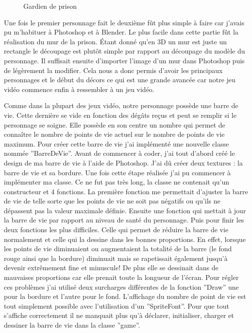 \documentclass[12pt]{article}
\begin{document}
\begin{figure}[htbp]
\begin{minipage}[c]{.45\linewidth}
\begin{center}
\caption{Gardien de prison}
\label{fig:bellik}
\end{center}
\end{minipage}
\end{figure}

\par
Une fois le premier personnage fait le deuxième fût plus simple à faire car j'avais pu m'habituer à Photoshop et à Blender. Le plus facile dans cette partie fût la réalisation du mur de la prison. Étant donné qu'en 3D un mur est juste un rectangle le découpage est plutôt simple par rapport au découpage du modèle du personnage. Il suffisait ensuite d'importer l'image d'un mur dans Photoshop puis de légèrement la modifier. Cela nous a donc permis d'avoir les principaux personnages et le début du décors ce qui est une grande avancée car notre jeu vidéo commence enfin à ressembler à un jeu vidéo.

\par
Comme dans la plupart des jeux vidéo, notre personnage possède une barre de vie. Cette dernière se vide en fonction des dégâts reçus et peut se remplir si le personnage se soigne. Elle possède en son centre un nombre qui permet de connaître le nombre de points de vie actuel sur le nombre de points de vie maximum. Pour créer cette barre de vie j'ai implémenté une nouvelle classe nommée ''BarreDeVie''. Avant de commencer à coder, j'ai tout d'abord créé le design de ma barre de
vie à l'aide de Photoshop. J'ai dû créer deux textures : la barre de vie et sa bordure. Une fois cette étape réalisée j'ai pu commencer à implémenter ma classe. Ce ne fut pas très long, la classe ne contenait qu'un constructeur et 4 fonctions. La première fonction me permettait d'ajuster la barre de vie de telle sorte que les points de vie ne soit pas négatifs ou qu'ils ne dépassent pas la valeur maximale définie. Ensuite une fonction qui mettait à jour la barre de vie par rapport au niveau de santé du personnage. Puis pour finir les deux fonctions les plus difficiles. Celle qui permet de réduire la barre de vie normalement et celle qui la dessine dans les bonnes proportions. En effet, lorsque les points de vie diminuaient ou augmentaient la totalité de la barre (le fond rouge ainsi que la bordure) diminuait mais se rapetissait également jusqu'à devenir extrêmement fine et minuscule! De plus elle se dessinait dans de mauvaises proportions car elle prenait toute la longueur de l'écran. Pour régler ces problèmes j'ai utilisé deux surcharges différentes de la fonction ''Draw'' une pour la bordure et l'autre pour le fond. L'affichage du nombre de point de vie est tout simplement possible avec l'utilisation d'un ''SpriteFont''. Pour que tout s'affiche correctement il ne manquait plus qu'à déclarer, initialiser, charger et dessiner la barre de vie dans la classe ''game''.
\end{document}
